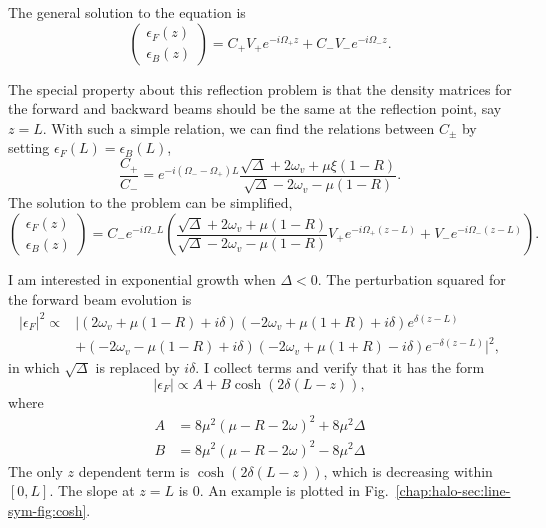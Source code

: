The general solution to the equation is
\begin{equation*}
   \begin{pmatrix}
   \epsilon_F(z) \\
   \epsilon_B(z)
   \end{pmatrix} = C_+ V_+ e^{-i \Omega_+ z} +  C_- V_- e^{-i \Omega_- z}.
\end{equation*}

The special property about this reflection problem is that the density matrices for the forward and backward beams should be the same at the reflection point, say $z=L$. With such a simple relation, we can find the relations between $C_\pm$ by setting $\epsilon_F(L)=\epsilon_B(L)$,
\begin{equation}
   \frac{C_+}{C_-} = e^{-i(\Omega_- -\Omega_+)L} \frac{ \sqrt{\Delta} +  2\omega_v + \mu \xi (1-R) }{\sqrt{\Delta} -  2\omega_v - \mu (1-R)}.
\end{equation}
The solution to the problem can be simplified,
\begin{equation}
   \begin{pmatrix}
   \epsilon_F(z) \\
   \epsilon_B(z)
   \end{pmatrix} = C_- e^{-i\Omega_- L} \left( \frac{ \sqrt{\Delta} +  2\omega_v + \mu  (1-R) }{\sqrt{\Delta} -  2\omega_v - \mu (1-R)} V_+ e^{-i \Omega_+ (z-L)} +  V_- e^{-i \Omega_- (z-L)} \right).
\end{equation}

I am interested in exponential growth when $\Delta < 0$. The perturbation squared for the forward beam evolution is
\begin{align*}
   \left\vert \epsilon_F \right\vert^2 \propto & \lvert (2\omega_v + \mu(1-R) +i \delta ) ( -2\omega_v + \mu(1+R) + i \delta ) e^{\delta(z-L)} \\
   &+ ( -2\omega_v - \mu(1-R) +i \delta ) ( -2\omega_v + \mu(1+R) - i \delta ) e^{-\delta(z-L)} \rvert^2,
\end{align*}
in which $\sqrt{\Delta}$ is replaced by $i \delta$. I collect terms and verify that it has the form
\begin{equation}
   \left\vert \epsilon_F \right\vert \propto A + B \cosh( 2\delta(L-z) ),
\end{equation}
where
\begin{align}
    A &= 8 \mu^2 (\mu - R - 2 \omega )^2 + 8 \mu^2 \Delta  \\
    B &= 8 \mu^2 (\mu - R - 2 \omega )^2 - 8 \mu^2 \Delta 
\end{align}
The only $z$ dependent term is $\cosh( 2\delta(L-z) )$, which is decreasing within $[0,L]$. The slope at $z=L$ is 0. An example is plotted in Fig.~\ref{chap:halo-sec:line-sym-fig:cosh}.


